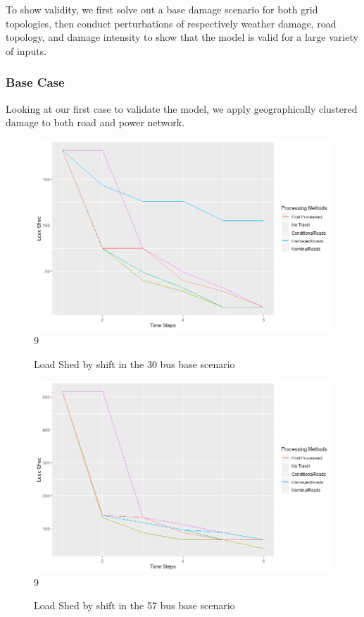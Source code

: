 \documentclass{article}
\begin{document}
	To show validity, we first solve out a base damage scenario for both grid topologies, then conduct perturbations of respectively weather damage, road topology, and damage intensity to show that the model is valid for a large variety of inputs. 
	
	\subsubsection{Base Case}
	Looking at our first case to validate the model, we apply geographically clustered damage to both road and power network. 
	
	\begin{figure}[H]
		\centering
		
			\centering
			\includegraphics[width=.9\linewidth]{Rplot37.png}9
			\caption{Load Shed by shift in the 30 bus base scenario}
			\label{fig:sub1}
		\end{figure}
	
	\begin{figure}[H]
		\centering
		
		\centering
		\includegraphics[width=.9\linewidth]{Rplot57.png}9
		\caption{Load Shed by shift in the 57 bus base scenario}
		\label{fig:sub1}
	\end{figure}
\end{document}
